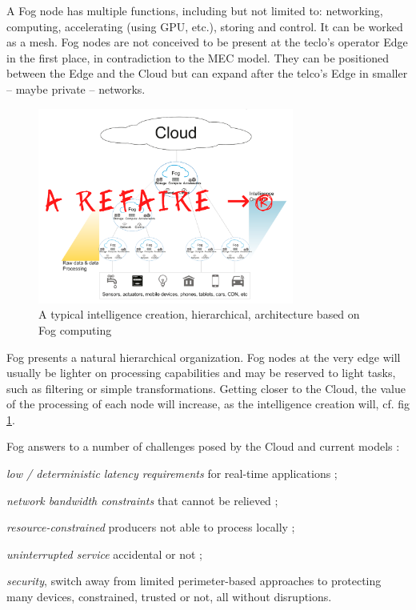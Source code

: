 \documentclass[11pt]{sdm}
\begin{document}
\begin{description}
	A Fog node has multiple functions, including but not limited to: networking, computing, accelerating (using \gls{GPU}, etc.), storing and control. It can be worked as a mesh. Fog nodes are not conceived to be present at the teclo's operator Edge in the first place, in contradiction to the \gls{MEC} model. They can be positioned between the Edge and the Cloud but can expand after the telco's Edge in smaller -- maybe private -- networks.
	
	\begin{figure}[t]
		\centering
		\includegraphics[width=0.75\textwidth]{./assets/FogArchi.png}
		\caption{A typical intelligence creation, hierarchical, architecture based on Fog computing}
		\label{fig:fog_archi}
	\end{figure}
	
	Fog presents a natural hierarchical organization. Fog nodes at the very edge will usually be lighter on processing capabilities and may be reserved to light tasks, such as filtering or simple transformations. Getting closer to the Cloud, the value of the processing of each node will increase, as the intelligence creation will, cf. fig \ref{fig:fog_archi}.
	
	Fog answers to a number of challenges posed by the Cloud and current models \cite{chiang_fog_2016}: 
	\begin{enumerate*}[(a)]
		\item \emph{low / deterministic latency requirements} for real-time applications ;
		\item \emph{network bandwidth constraints} that cannot be relieved ;
		\item \emph{resource-constrained} producers not able to process locally ;
		\item \emph{uninterrupted service} accidental or not ;
		\item \emph{security}, switch away from limited perimeter-based approaches to protecting many devices, constrained, trusted or not, all without disruptions.
	\end{enumerate*}
	

\end{description}
\end{document}
